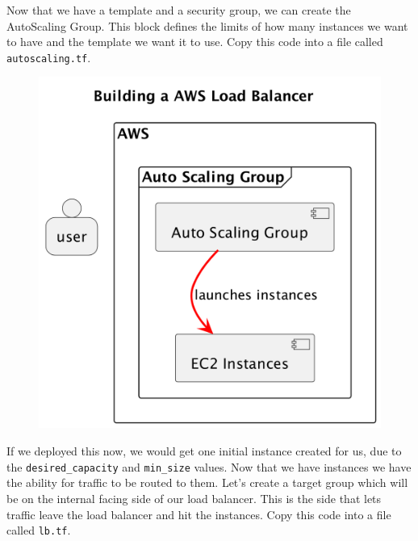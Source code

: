 \documentclass{csse4400}
\begin{document}
Now that we have a template and a security group, we can create the AutoScaling Group.
This block defines the limits of how many instances we want to have and the template we want it to use.
Copy this code into a file called \texttt{autoscaling.tf}.

\begin{figure}[H]
  \begin{center}
    \includegraphics[scale=0.2]{diagrams/lb1}
  \end{center}
\end{figure}


If we deployed this now, we would get one initial instance created for us, due to the \texttt{desired\_capacity} and \texttt{min\_size} values.
Now that we have instances we have the ability for traffic to be routed to them.
Let's create a target group which will be on the internal facing side of our load balancer.
This is the side that lets traffic leave the load balancer and hit the instances.
Copy this code into a file called \texttt{lb.tf}.
\end{document}
